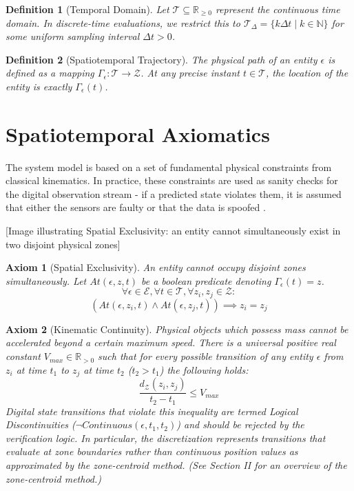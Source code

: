 \documentclass[conference]{IEEEtran}
\newtheorem{definition}{Definition}
\newtheorem{axiom}{Axiom}
\newcommand{\E}{\mathcal{E}} %
\newcommand{\Z}{\mathcal{Z}} %
\newcommand{\T}{\mathcal{T}} %
\newcommand{\Tr}{\Gamma} %
\begin{document}
\begin{definition}[Temporal Domain]
Let $\T \subseteq \mathbb{R}_{\ge 0}$ represent the continuous time domain. In discrete-time evaluations, we restrict this to $\T_{\Delta} = \{ k\Delta t \mid k \in \mathbb{N} \}$ for some uniform sampling interval $\Delta t > 0$.
\end{definition}

\begin{definition}[Spatiotemporal Trajectory]
The physical path of an entity $\epsilon$ is defined as a mapping $\Tr_\epsilon: \T \to \Z$. At any precise instant $t \in \T$, the location of the entity is exactly $\Tr_\epsilon(t)$.
\end{definition}

\section{Spatiotemporal Axiomatics}

The system model is based on a set of fundamental physical constraints from classical kinematics. In practice, these constraints are used as sanity checks for the digital observation stream - if a predicted state violates them, it is assumed that either the sensors are faulty or that the data is spoofed \cite{b18}.

[Image illustrating Spatial Exclusivity: an entity cannot simultaneously exist in two disjoint physical zones]

\begin{axiom}[Spatial Exclusivity]
An entity cannot occupy disjoint zones simultaneously. Let $At(\epsilon, z, t)$ be a boolean predicate denoting $\Tr_\epsilon(t) = z$.
\begin{equation}
\forall \epsilon \in \E, \forall t \in \T, \forall z_i, z_j \in \Z: 
\end{equation}
\begin{equation*}
(At(\epsilon, z_i, t) \land At(\epsilon, z_j, t)) \implies z_i = z_j
\end{equation*}
\end{axiom}

\begin{axiom}[Kinematic Continuity]
Physical objects which possess mass cannot be accelerated beyond a certain maximum speed. There is a universal positive real constant $V_{max} \in \mathbb{R}_{>0}$ such that for every possible transition of any entity $\epsilon$ from $z_i$ at time $t_1$ to $z_j$ at time $t_2$ ($t_2 > t_1$) the following holds:
\begin{equation}
\frac{d_\Z(z_i, z_j)}{t_2 - t_1} \le V_{max}
\end{equation}
Digital state transitions that violate this inequality are termed Logical Discontinuities ($\neg Continuous(\epsilon, t_1, t_2)$) and should be rejected by the verification logic. In particular, the discretization represents transitions that evaluate at zone boundaries rather than continuous position values as approximated by the zone-centroid method. (See Section II for an overview of the zone-centroid method.)
\end{axiom}
\end{document}
